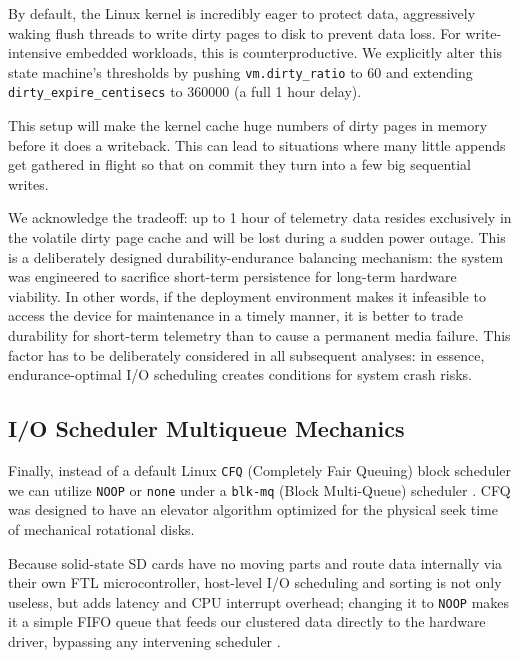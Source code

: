 \documentclass[conference]{IEEEtran}
\begin{document}
By default, the Linux kernel is incredibly eager to protect data, aggressively waking flush threads to write dirty pages to disk to prevent data loss. For write-intensive embedded workloads, this is counterproductive. We explicitly alter this state machine's thresholds by pushing \texttt{vm.dirty\_ratio} to 60 and extending \texttt{dirty\_expire\_centisecs} to 360000 (a full 1 hour delay). 

This setup will make the kernel cache huge numbers of dirty pages in memory before it does a writeback. This can lead to situations where many little appends get gathered in flight so that on commit they turn into a few big sequential writes.

We acknowledge the tradeoff: up to 1 hour of telemetry data resides exclusively in the volatile dirty page cache and will be lost during a sudden power outage. This is a deliberately designed durability-endurance balancing mechanism: the system was engineered to sacrifice short-term persistence for long-term hardware viability. In other words, if the deployment environment makes it infeasible to access the device for maintenance in a timely manner, it is better to trade durability for short-term telemetry than to cause a permanent media failure. This factor has to be deliberately considered in all subsequent analyses: in essence, endurance-optimal I/O scheduling creates conditions for system crash risks.

\subsection{I/O Scheduler Multiqueue Mechanics}
Finally, instead of a default Linux \texttt{CFQ} (Completely Fair Queuing) block scheduler we can utilize \texttt{NOOP} or \texttt{none} under a \texttt{blk-mq} (Block Multi-Queue) scheduler \cite{b16}. CFQ was designed to have an elevator algorithm optimized for the physical seek time of mechanical rotational disks.

Because solid-state SD cards have no moving parts and route data internally via their own FTL microcontroller, host-level I/O scheduling and sorting is not only useless, but adds latency and CPU interrupt overhead; changing it to \texttt{NOOP} makes it a simple FIFO queue that feeds our clustered data directly to the hardware driver, bypassing any intervening scheduler \cite{b15}.

\end{document}
